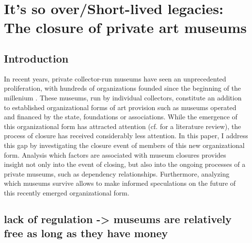 \documentclass[12pt]{article}
\author{Johannes }
\date{\today}
\title{}
\begin{document}
\section*{It's so over/Short-lived legacies: The closure of private art museums}



\subsection*{Introduction}


In recent years, private collector-run museums have seen an unprecedented proliferation, with hundreds of organizations founded since the beginning of the millenium \parencite{Velthuis_etal_2023_boom,LarrysList_2015_report}.
These museums, run by individual collectors, constitute an addition to established organizational forms of art provision such as museums operated and financed by the state, foundations or associations.
While the emergence of this organizational form has attracted attention (cf. \cite{Kolbe_etal_2022_privatemuseum} for a literature review), the process of closure has received considerably less attention.
In this paper, I address this gap by investigating the closure event of members of this new organizational form.
Analysis which factors are associated with museum closures provides insight not only into the event of closing, but also into the ongoing processes of a private museums, such as dependency relationships.
Furthermore, analyzing which museums survive allows to make informed speculations on the future of this recently emerged organizational form.









\subsection*{lack of regulation -> museums are relatively free as long as they have money}
\end{document}

